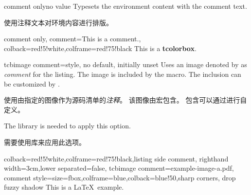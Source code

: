 \begin{docTcbKey}[][doc new=2014-11-17]{comment only}{}{no value}
Typesets the environment content with the comment text.

使用注释文本对环境内容进行排版。
\begin{dispExample}
\begin{tcblisting}{comment only,
comment={This is a comment.},
colback=red!5!white,colframe=red!75!black}
This is a \textbf{tcolorbox}.
\end{tcblisting}
\end{dispExample}
\end{docTcbKey}





\begin{docTcbKey}[][doc new=2014-11-14]{tcbimage comment}{=}{style, no default, initially unset}
Uses an image denoted by  as \textit{comment} for the listing.
The image is included by the  macro.
The inclusion can be customized by .

使用由指定的图像作为源码清单的\textit{注释}。 该图像由宏包含。 包含可以通过进行自定义。
\begin{marker}
The library  is needed to apply this option.

需要使用库来应用此选项。
\end{marker}
\medskip
\begin{dispExample}
\begin{tcblisting}{colback=red!5!white,colframe=red!75!black,listing side comment,
righthand width=3cm,lower separated=false,
tcbimage comment={example-image-a.pdf},
comment style={size=fbox,colframe=blue,colback=blue!50,sharp corners,
drop fuzzy shadow}}
This is a \LaTeX\ example.
\end{tcblisting}
\end{dispExample}
\end{docTcbKey}

